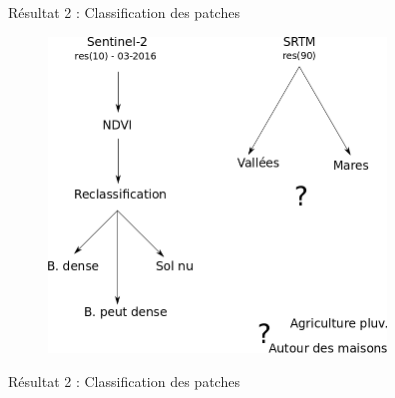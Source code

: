 \documentclass[newPxFont]{beamer}
\begin{document}
\begin{frame}[c]{Résultat 2 : Classification des patches}
\vspace{-1cm}
\begin{figure}
  \centering
  \includegraphics[width = 0.8\textwidth]{img/process}
\end{figure}

\end{frame}

\begin{frame}[c]{Résultat 2 : Classification des patches}
\vspace{-1cm}
\begin{figure}
\end{figure}
\end{frame}
\end{document}
